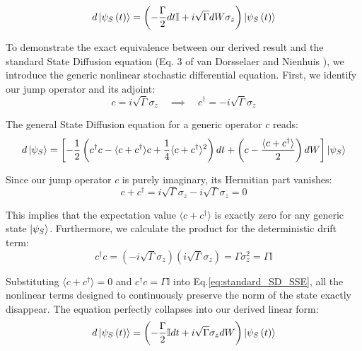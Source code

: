 \documentclass[a4paper,12pt]{article}
\begin{document}
\begin{equation}
	d\ket{\psi_{S}\left(t\right)} = \left( - \frac{\Gamma}{2} dt \mathbb{I} + i \sqrt{\Gamma} dW \sigma_{z} \right) \ket{\psi_{S}\left(t\right)}
\end{equation}

To demonstrate the exact equivalence between our derived result and the standard State Diffusion equation (Eq. 3 of van Dorsselaer and Nienhuis \cite{vandorsselaerQuantumTrajectoriesGeneralized} ), we introduce the generic nonlinear stochastic differential equation. First, we identify our jump operator and its adjoint:
\begin{equation}
	c = i\sqrt{\Gamma}\sigma_{z} \quad \implies \quad c^\dagger = -i\sqrt{\Gamma}\sigma_{z}
\end{equation}

The general State Diffusion equation for a generic operator $c$ reads:
\begin{equation}
	d\ket{\psi_{S}} = \left[ -\frac{1}{2}\left(c^\dagger c - \langle c + c^\dagger \rangle c + \frac{1}{4}\langle c + c^\dagger \rangle^2 \right)dt + \left(c - \frac{\langle c + c^\dagger \rangle}{2}\right)dW \right] \ket{\psi_{S}}
	\label{eq:standard_SD_SSE}
\end{equation}

Since our jump operator $c$ is purely imaginary, its Hermitian part vanishes:
\begin{equation}
	c + c^\dagger = i\sqrt{\Gamma}\sigma_{z} - i\sqrt{\Gamma}\sigma_{z} = 0
\end{equation}

This implies that the expectation value $\langle c + c^\dagger \rangle$ is exactly zero for any generic state $\ket{\psi_{S}}$. Furthermore, we calculate the product for the deterministic drift term:
\begin{equation}
	c^\dagger c = (-i\sqrt{\Gamma}\sigma_{z})(i\sqrt{\Gamma}\sigma_{z}) = \Gamma\sigma_{z}^{2} = \Gamma\mathbb{I}
\end{equation}

Substituting $\langle c + c^\dagger \rangle = 0$ and $c^\dagger c = \Gamma\mathbb{I}$ into Eq.\ref{eq:standard_SD_SSE}, all the nonlinear terms designed to continuously preserve the norm of the state exactly disappear. The equation perfectly collapses into our derived linear form:
\begin{equation}
	d\ket{\psi_{S}\left(t\right)} = \left( - \frac{\Gamma}{2} \mathbb{I} dt + i \sqrt{\Gamma} \sigma_{z} dW \right) \ket{\psi_{S}\left(t\right)}
\end{equation}
\end{document}
